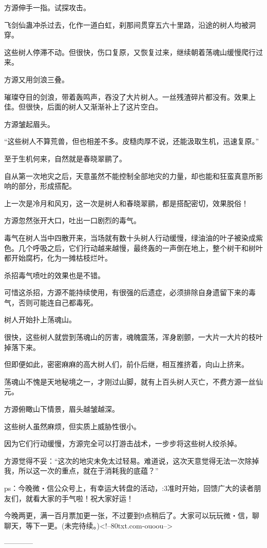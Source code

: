 \begin{this_body}
方源伸手一指。试探攻击。

飞剑仙蛊冲杀过去，化作一道白虹，刹那间贯穿五六十里路，沿途的树人均被洞穿。

这些树人停滞不动。但很快，伤口复原，又恢复过来，继续朝着荡魂山缓慢爬行过来。

方源又用剑浪三叠。

璀璨夺目的剑浪，带着轰鸣声，吞没了大片树人。一丝残渣碎片都没有。效果上佳。但很快，后面的树人又渐渐补上了这片空白。

方源皱起眉头。

“这些树人不算荒兽，但也相差不多。皮糙肉厚不说，还能汲取生机，迅速复原。”

至于生机何来，自然就是春晓翠鹂了。

自从第一次地灾之后，天意虽然不能控制全部地灾的力量，却也能和狂蛮真意所影响的部分，形成搭配。

上一次是冷月和风刃，这一次是树人和春晓翠鹂，都是搭配密切，效果脱俗！

方源忽然张开大口，吐出一口剧烈的毒气。

毒气在树人当中四散开来，当场就有数十头树人行动缓慢，绿油油的叶子被染成紫色。几个呼吸之后，它们行动越来越慢，最终轰的一声倒在地上，整个树干和树叶都开始腐朽，化为一摊枯枝烂叶。

杀招毒气喷吐的效果也是不错。

可惜这杀招，方源不能持续使用，有很强的后遗症，必须排除自身遗留下来的毒气，否则可能连自己都毒死。

树人开始扑上荡魂山。

很快，这些树人就尝到荡魂山的厉害，魂魄震荡，浑身剧颤，一大片一大片的枝叶掉落下来。

但即便如此，密密麻麻的高大树人们，前仆后继，相互推挤着，向山上挤来。

荡魂山不愧是天地秘境之一，才刚过山脚，就有上百头树人灭亡，不费方源一丝仙元。

方源俯瞰山下情景，眉头越皱越深。

这些树人虽然麻烦，但实质上威胁性很小。

因为它们行动缓慢，方源完全可以打游击战术，一步步将这些树人绞杀掉。

方源觉得不妥：“这次的地灾未免太过轻易。难道说，这次天意觉得无法一次除掉我，所以这一次的重点，就在于消耗我的底蕴？”

ps：今晚微・信公众号上，有幸运大转盘的活动，:3准时开始，回馈广大的读者朋友们，就看大家的手气啦！祝大家好运！

今晚两更，满一百月票加更一张，不过要到9点稍后了。大家可以玩玩微・信，聊聊天，等下一更。(未完待续。)<!--80txt.com-ouoou-->

------------

\end{this_body}

